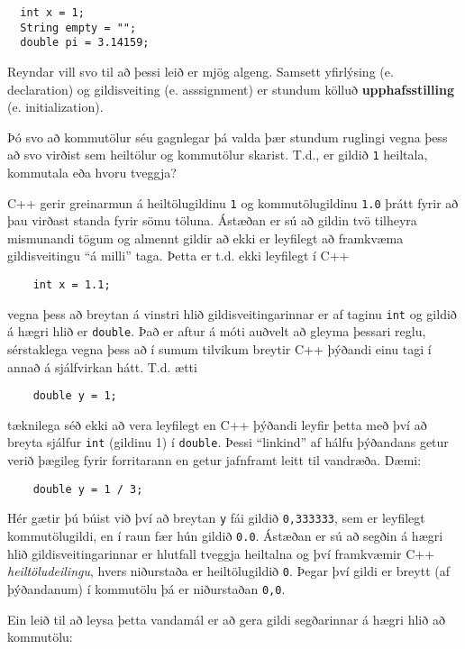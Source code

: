 \begin{verbatim}
  int x = 1;
  String empty = "";
  double pi = 3.14159;
\end{verbatim}
%
Reyndar vill svo til að þessi leið er mjög algeng.
Samsett yfirlýsing (e. declaration) og gildisveiting (e. asssignment) er stundum kölluð {\bf upphafsstilling} (e. initialization).


Þó svo að kommutölur séu gagnlegar þá valda þær stundum ruglingi vegna þess að svo virðist sem heiltölur og kommutölur skarist. 
T.d., er gildið {\tt 1} heiltala, kommutala eða hvoru tveggja?

C++ gerir greinarmun á heiltölugildinu {\tt 1} og kommutölugildinu {\tt 1.0} þrátt fyrir að þau virðast standa fyrir sömu töluna.
Ástæðan er sú að gildin tvö tilheyra mismunandi tögum og almennt gildir að ekki er leyfilegt að framkvæma gildisveitingu ``á milli'' taga.
Þetta er t.d. ekki leyfilegt í C++

\begin{verbatim}
    int x = 1.1;
\end{verbatim}
%
vegna þess að breytan á vinstri hlið gildisveitingarinnar er af taginu {\tt int} og gildið á hægri hlið er {\tt double}.
Það er aftur á móti auðvelt að gleyma þessari reglu, sérstaklega vegna þess að í sumum tilvikum breytir C++ þýðandi einu tagi í annað á sjálfvirkan hátt.
T.d. ætti 

\begin{verbatim}
    double y = 1;
\end{verbatim}
%
tæknilega séð ekki að vera leyfilegt en C++ þýðandi leyfir þetta með því að breyta sjálfur
{\tt int} (gildinu 1) í {\tt double}.
Þessi ``linkind'' af hálfu þýðandans getur verið þægileg fyrir forritarann en getur jafnframt leitt til vandræða.
Dæmi:

\begin{verbatim}
    double y = 1 / 3;
\end{verbatim}
%
Hér gætir þú búist við því að breytan {\tt y} fái gildið {\tt 0,333333}, sem er leyfilegt kommutölugildi, en í raun fær hún gildið {\tt 0.0}.
Ástæðan er sú að segðin á hægri hlið gildisveitingarinnar er hlutfall tveggja heiltalna og því framkvæmir C++ {\em heiltöludeilingu}, hvers niðurstaða er heiltölugildið {\tt 0}.
Þegar því gildi er breytt (af þýðandanum) í kommutölu þá er niðurstaðan {\tt 0,0}.

Ein leið til að leysa þetta vandamál er að gera gildi segðarinnar á hægri hlið að kommutölu:


